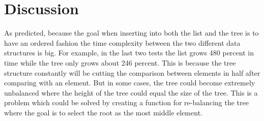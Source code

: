 \documentclass[a4paper,11pt]{article}
\begin{document}
\section*{Discussion}
As predicted, because the goal when inserting into both the list and the tree is to have an ordered fashion the time complexity between the two different data structures is big. For example, in the last two tests the list grows 480 percent in time while the tree only grows about 246 percent. This is because the tree structure constantly will be cutting the comparison between elements in half after comparing with an element. But in some cases, the tree could become extremely unbalanced where the height of the tree could equal the size of the tree. This is a problem which could be solved by creating a function for re-balancing the tree where the goal is to select the root as the most middle element.
\end{document}
